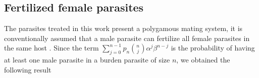 \documentclass[12pt,a4paper]{article}
\theoremstyle{plain}%
\theoremstyle{definition}
\theoremstyle{remark}
\begin{document}
	
	
	
	
	
	
	
	\subsection{Fertilized female parasites}

	The parasites treated in this work present a polygamous mating system, 
	it is conventionally assumed that a male parasite can fertilize all female parasites in the same host \cite{may1993biased}.
	Since the term $\sum_{j=0}^{n-1} p_n\binom{n}{j}\alpha^j\beta^{n-j}$ 
	is the probability of having at least one male parasite in a burden parasite of size $n$, we obtained the following result	
\end{document}
